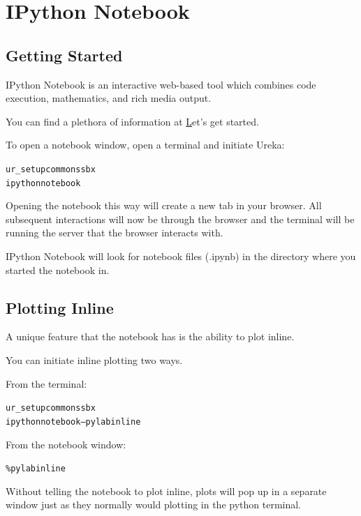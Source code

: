 \chapter{IPython Notebook}
\label{ch:notebook}

\section{Getting Started}

IPython Notebook is an interactive web-based tool which combines code execution, mathematics, and rich media output.

You can find a plethora of information at \href{http://ipython.org/ipython-doc/dev/notebook/index.html}

Let's get started.

To open a notebook window, open a terminal and initiate Ureka:

\begin{alltt}
\termtab ur_setup common ssbx
\termtab ipython notebook
\end{alltt}

Opening the notebook this way will create a new tab in your browser. All subsequent interactions will now
be through the browser and the terminal will be running the server that the browser interacts with.

IPython Notebook will look for notebook files (.ipynb) in the directory where you started the notebook in.


\section{Plotting Inline}

A unique feature that the notebook has is the ability to plot inline.

You can initiate inline plotting two ways.

From the terminal:

\begin{alltt}
\termtab ur_setup common ssbx
\termtab ipython notebook --pylab inline
\end{alltt}

From the notebook window:

\begin{alltt}
\pytab \%pylab inline
\end{alltt}

Without telling the notebook to plot inline, plots will pop up in a separate window just as they normally
would plotting in the python terminal.

